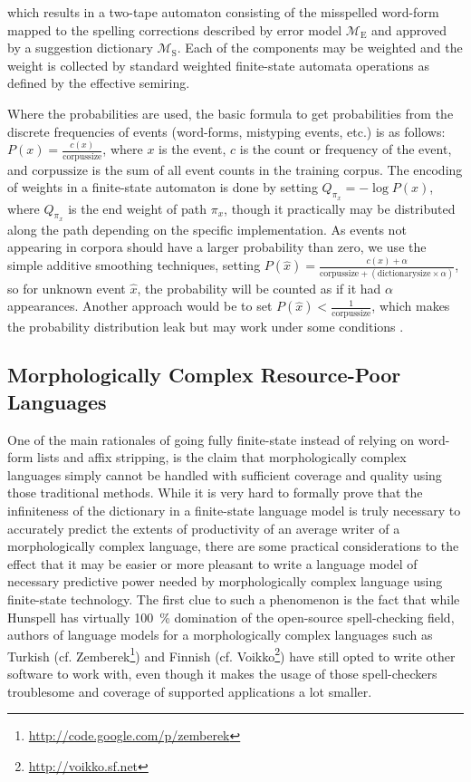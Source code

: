 \documentclass[a4paper,12pt]{article}
\begin{document}
which results in a two-tape automaton consisting of the misspelled word-form
mapped to the spelling corrections described by
error model $\mathcal{M}_\mathrm{E}$ and approved by a suggestion dictionary
$\mathcal{M}_\mathrm{S}$. Each of the components may be weighted and the
weight is collected by standard weighted finite-state automata operations as
defined by the effective semiring.

Where the probabilities are used, the basic formula to get probabilities from
the discrete frequencies of events (word-forms, mistyping events, etc.) is
as follows: $P(x) = \frac{c(x)}{\mathrm{corpus size}}$, where $x$ is the event,
$c$ is the count or frequency of the event, and $\mathrm{corpus size}$ is the
sum of all event counts in the training corpus. The encoding of weights in a
finite-state automaton is done by setting $Q_{\pi_x} = -\log P(x)$, where
$Q_{\pi_x}$ is the end weight of path $\pi_x$, though it practically may be
distributed along the path depending on the specific implementation. As events
not appearing in corpora should have a larger probability than zero, we use the
simple additive smoothing techniques, setting $P(\hat{x}) = \frac{c(x) +
\alpha}{\mathrm{corpus size} + (\mathrm{dictionary size} \times \alpha)}$, so
for unknown event $\hat{x}$, the probability will be counted as if it had
$\alpha$ appearances. Another approach would be to set $P(\hat{x}) <
\frac{1}{\mathrm{corpus size}}$, which makes the probability distribution leak
but may work under some conditions \cite[]{brants2007large}.

\subsection{Morphologically Complex Resource-Poor Languages}
\label{subsec:morphologically-complex}

One of the main rationales of going fully finite-state instead of relying on
word-form lists and affix stripping, is the claim that morphologically complex
languages simply cannot be handled with sufficient coverage and quality using
those traditional methods. While it is very hard to formally prove that the
infiniteness of the dictionary in a finite-state language model is truly
necessary to accurately predict the extents of productivity of an average
writer of a morphologically complex language, there are some practical
considerations to the effect that it may be easier or more pleasant to write a
language model of necessary predictive power needed by morphologically complex
language using finite-state technology. The first clue to such a phenomenon is
the fact that while Hunspell has virtually 100~\% domination of the open-source
spell-checking field, authors of language models for a morphologically
complex languages such as Turkish (cf.
Zemberek\footnote{\url{http://code.google.com/p/zemberek}}) and Finnish (cf.
Voikko\footnote{\url{http://voikko.sf.net}}) have still opted to write other
software to work with, even though it makes the usage of those spell-checkers
troublesome and coverage of supported applications a lot smaller.  %
\end{document}
